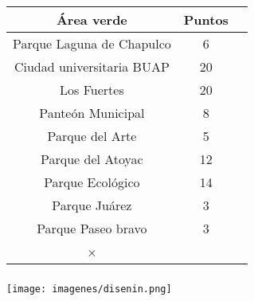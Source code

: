 \documentclass[compress]{beamer}
\begin{document}
{
\begin{frame}
\frametitle{}
\begin{center}
{\normalsize
\begin{tabular}{ccc} \toprule
Área verde & Puntos \\ \midrule
Parque Laguna de Chapulco & 6 \\
Ciudad universitaria BUAP & 20 \\
Los Fuertes & 20 \\
Panteón Municipal & 8  \\
Parque del Arte & 5 \\
Parque del Atoyac & 12 \\
Parque Ecológico & 14 \\
Parque Juárez & 3 \\
Parque Paseo bravo & 3 \\ \bottonrule
 ×
\end{tabular}
}
\end{center}
\end{frame}
}
{
\begin{frame}
\frametitle{}
\vspace{-0.5cm}

\begin{center}
\hspace*{-1cm}\texttt{[image: imagenes/disenin.png]}\\

\end{center}

\end{frame}
}
\end{document}
